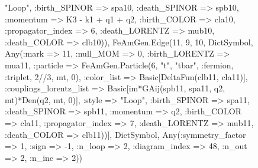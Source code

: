 \documentclass{revtex4}
\begin{document}
\begin{figure}[!htb]
\begin{center}
{"Loop", :birth_SPINOR => spa10, :death_SPINOR => spb10, :momentum => K3 - k1 + q1 + q2, :birth_COLOR => cla10, :propagator_index => 6, :death_LORENTZ => mub10, :death_COLOR => clb10)), FeAmGen.Edge(11, 9, 10, Dict{Symbol, Any}(:mark => 11, :null_MOM => 0, :birth_LORENTZ => mua11, :particle => FeAmGen.Particle(6, "t", "tbar", :fermion, :triplet, 2//3, mt, 0), :color_list => Basic[DeltaFun(clb11, cla11)], :couplings_lorentz_list => Basic[im*GAij(spb11, spa11, q2, mt)*Den(q2, mt, 0)], :style => "Loop", :birth_SPINOR => spa11, :death_SPINOR => spb11, :momentum => q2, :birth_COLOR => cla11, :propagator_index => 7, :death_LORENTZ => mub11, :death_COLOR => clb11))], Dict{Symbol, Any}(:symmetry_factor => 1, :sign => -1, :n_loop => 2, :diagram_index => 48, :n_out => 2, :n_inc => 2)) 
}
\end{center}
\end{figure}
\end{document}
